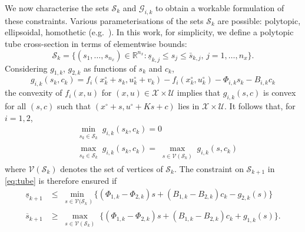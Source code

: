 \documentclass[a4paper, 10 pt, conference]{IEEEconf}
\def\RR{\mathbb{R}}
\def\G{\mathcal{G}}
\def\S{\mathcal{S}}
\def\V{\mathcal{V}}
\def\U{\mathcal{U}}
\def\X{\mathcal{X}}
\begin{document}
We now characterise the sets $\S_{k}$ and $\G_{i, k}$ to obtain a workable formulation of these constraints.
%
Various parameterisations of the sets $\S_k$ are possible: polytopic,  ellipsoidal, homothetic (e.g.~\cite{kouvaritakis}). In this work, for simplicity, we define a polytopic tube cross-section in terms of elementwise bounds:
%
\[
\S_k = \{ (s_{1}, \ldots, s_{n_x})\!\in\!\RR^{n_x} : \underline{s}_{k, j} \!\leq\! s_{j} \!\leq\! \bar{s}_{k, j},  \, j = 1, \ldots, n_x \} .
\]
Considering $g_{1,k}$, $g_{2,k}$ as functions of $s_k$ and $c_k$,
\[%
g_{i,k}(s_k,c_k) \!=\! 
f_i(x^\circ_k + s_{k}, \! u^\circ_k + v_k) - f_i(x^\circ_k, \! u^\circ_k) - \Phi_{i, k} s_k - B_{i, k} c_k  
\]%
the convexity of $f_i(x,u)$ for $(x,u)\in\X\times\U$ implies that $g_{i,k}(s,c)$ 
is convex for all $(s,c)$ such that $(x^\circ+s,u^\circ+Ks+c)$ lies in $\X\times\U$. It follows that, for $i=1,2$,
%
\begin{align*}
& \min_{\substack{s_k \in \S_k}} g_{i,k}(s_k,c_k) = 0
\\
& \max_{\substack{s_k \in \S_k}} g_{i,k}(s_k,c_k) = \max_{\substack{s \in \V(\S_k)}} g_{i,k}(s,c_k) 
\end{align*}
%
where $\V(\S_k)$ denotes the set of vertices of $\S_k$. The constraint on $\S_{k+1}$ in \eqref{eq:tube} is therefore ensured if
%
\begin{align*}
\underline{s}_{k+1} &\leq \! \min_{\substack{s \in \V(\S_k})} \! \{(\Phi_{1, k}\!-\!\Phi_{2, k}) s + (B_{1, k}\!-\!B_{2, k}) c_k - g_{2,k}(s)\}
\\
%
\overline{s}_{k+1} &\geq \! \max_{\substack{s \in \V(\S_k)}} \! \{(\Phi_{1, k}\!-\!\Phi_{2, k}) s + (B_{1, k}\!-\!B_{2, k}) c_k + g_{1, k}(s) \}. 
\end{align*}
%
\end{document}
